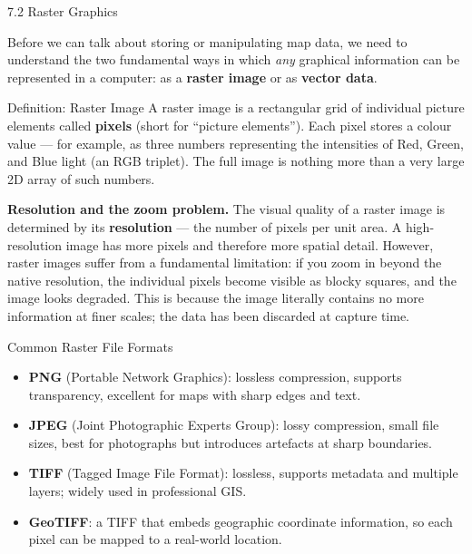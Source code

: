\documentclass[aspectratio=169,10pt]{beamer}
\begin{document}
\begin{frame}[allowframebreaks]{7.2 Raster Graphics}

  Before we can talk about storing or manipulating map data, we need
  to understand the two fundamental ways in which \emph{any} graphical
  information can be represented in a computer: as a
  \textbf{raster image} or as \textbf{vector data}.

  \begin{block}{Definition: Raster Image}
    A raster image is a rectangular grid of individual picture elements
    called \textbf{pixels} (short for ``picture elements'').  Each pixel
    stores a colour value --- for example, as three numbers representing
    the intensities of Red, Green, and Blue light (an RGB triplet).
    The full image is nothing more than a very large 2D array of such
    numbers.
  \end{block}

  \framebreak

  \textbf{Resolution and the zoom problem.}
  The visual quality of a raster image is determined by its
  \textbf{resolution} --- the number of pixels per unit area.
  A high-resolution image has more pixels and therefore more spatial
  detail.  However, raster images suffer from a fundamental
  limitation: if you zoom in beyond the native resolution, the
  individual pixels become visible as blocky squares, and the image
  looks degraded.  This is because the image literally contains no
  more information at finer scales; the data has been discarded at
  capture time.

  \begin{block}{Common Raster File Formats}
    \begin{itemize}
      \item \textbf{PNG} (Portable Network Graphics): lossless
            compression, supports transparency, excellent for maps with
            sharp edges and text.
      \item \textbf{JPEG} (Joint Photographic Experts Group): lossy
            compression, small file sizes, best for photographs but
            introduces artefacts at sharp boundaries.
      \item \textbf{TIFF} (Tagged Image File Format): lossless, supports
            metadata and multiple layers; widely used in professional GIS.
      \item \textbf{GeoTIFF}: a TIFF that embeds geographic coordinate
            information, so each pixel can be mapped to a real-world
            location.
    \end{itemize}
  \end{block}


\end{frame}
\end{document}
